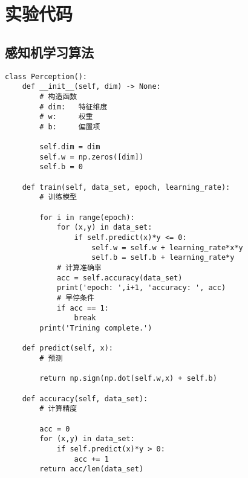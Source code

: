 \section{实验代码}

\subsection{感知机学习算法}

\begin{lstlisting}[caption = 感知机原型算法实现]
class Perception():
    def __init__(self, dim) -> None:
        # 构造函数
        # dim:   特征维度
        # w:     权重
        # b:     偏置项

        self.dim = dim
        self.w = np.zeros([dim])
        self.b = 0
    
    def train(self, data_set, epoch, learning_rate):
        # 训练模型

        for i in range(epoch):
            for (x,y) in data_set:
                if self.predict(x)*y <= 0:
                    self.w = self.w + learning_rate*x*y
                    self.b = self.b + learning_rate*y
            # 计算准确率
            acc = self.accuracy(data_set)
            print('epoch: ',i+1, 'accuracy: ', acc)
            # 早停条件
            if acc == 1:
                break
        print('Trining complete.')

    def predict(self, x):
        # 预测

        return np.sign(np.dot(self.w,x) + self.b)
    
    def accuracy(self, data_set):
        # 计算精度
        
        acc = 0
        for (x,y) in data_set:
            if self.predict(x)*y > 0:
                acc += 1
        return acc/len(data_set)
\end{lstlisting}

